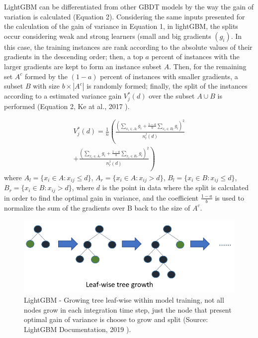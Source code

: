 \documentclass[letterpaper, 10 pt, conference]{ieeeconf}  %
\begin{document}
LightGBM can be differentiated from other GBDT models by the way the gain of variation is calculated (Equation 2). Considering the same inputs presented for the calculation of the gain of variance in Equation 1, in lightGBM, the splits occur considering weak and strong learners (small and big gradients $(g_i)$. In this case, the training instances are rank according to the absolute values of their gradients in the descending order; then, a top $a$ percent of instances with the larger gradients are kept to form an instance subset $A$. Then, for the remaining set $A^c$ formed by the $(1 - a)$ percent of instances with smaller gradients, a subset $B$ with size $b \times |A^c|$ is randomly formed; finally, the split of the instances according to a estimated variance gain $V^*_j(d)$ over the subset $A \cup B$ is performed (Equation 2, Ke at al., 2017 \cite{LGBM}).

\begin{equation}
\begin{split}
V^*_j(d)=\frac{1}{n}\left(\frac{\left(\sum_{x_i\in A_l} g_i+ \frac{1-a}{b} \sum_{x_i\in B_l} g_i\right)^2 }{n_l^j(d)}  \right. \\
\left. +\frac{\left(\sum_{x_i\in A_r} g_i+ \frac{1-a}{b} \sum_{x_i\in B_r}g_i\right)^2}{n_r^j(d)}\right)
\end{split}
\end{equation}
where $A_l=\{x_i \in A: x_{ij} \leqslant d\}$, $A_r=\{x_i \in A: x_{ij} > d\}$, $B_l=\{x_i \in B: x_{ij} \leqslant d\}$, $B_r=\{x_i \in B: x_{ij} > d\}$, where $d$ is the point in data where the split is calculated in order to find the optimal gain in variance, and the coefficient $\frac{1-a}{b}$ is used to normalize the sum of the gradients over B back to the size of $A^c$.\\


\begin{figure}[thpb]
\centering
\includegraphics[scale=0.4]{Figures/leaf-wise.png}
\caption{LightGBM - Growing tree leaf-wise within model training, not all nodes grow in each integration time step, just the node that present optimal gain of variance is choose to grow and split (Source: LightGBM Documentation, 2019 \cite{LightGBM2019}).}
\label{leaf_wise_tree}
\end{figure}
\end{document}
